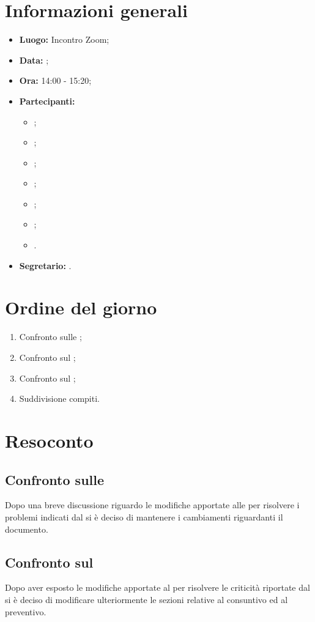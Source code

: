 \section{Informazioni generali}
\begin{itemize}
	\item \textbf{Luogo:} Incontro Zoom;
	\item \textbf{Data:} \Data;
	\item \textbf{Ora:} 14:00 - 15:20;
	\item \textbf{Partecipanti:}
	\begin{itemize}
		\item \BL{}; 
		\item \FF{};
		\item \MM{}; 
		\item \PC{};
		\item \TG{};
		\item \TL{};
		\item \VD{}.
	\end{itemize} 
	\item \textbf{Segretario:} \PC{}.
\end{itemize}

\section{Ordine del giorno}
\begin{enumerate}
	\item Confronto sulle \NdP{};
	\item Confronto sul \PdP{};
	\item Confronto sul \PdQ{};
	\item Suddivisione compiti.
\end{enumerate}

\section{Resoconto}
\subsection{Confronto sulle \NdP}
Dopo una breve discussione riguardo le modifiche apportate alle \NdP{} per risolvere i problemi indicati dal \VT{} si è deciso di mantenere i cambiamenti riguardanti il documento.
\subsection{Confronto sul \PdP}
Dopo aver esposto le modifiche apportate al \PdP{} per risolvere le criticità riportate dal \VT{} si è deciso di modificare ulteriormente le sezioni relative al consuntivo ed al preventivo.
